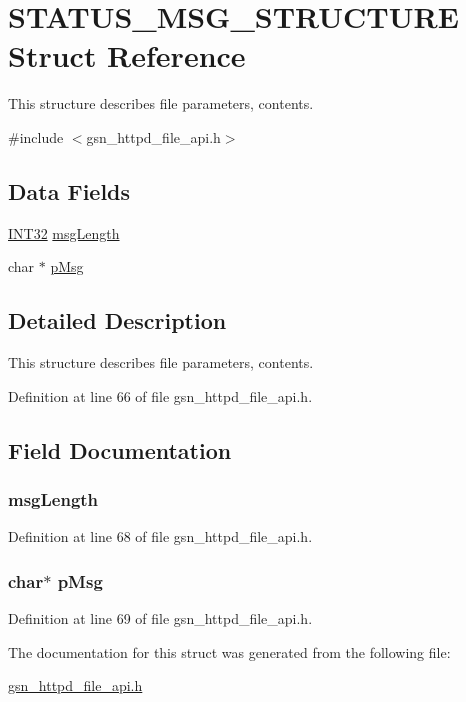 \hypertarget{a00461}{
\section{STATUS\_\-MSG\_\-STRUCTURE Struct Reference}
\label{a00461}
}


This structure describes file parameters, contents.  




{\ttfamily \#include $<$gsn\_\-httpd\_\-file\_\-api.h$>$}

\subsection*{Data Fields}
\begin{DoxyCompactItemize}
\item 
\hyperlink{a00660_ga63021d67d54286c2163bcdb43a6f2569}{INT32} \hyperlink{a00461_a3f0967ae6e83adfe4f7b64c137807c45}{msgLength}
\item 
char $\ast$ \hyperlink{a00461_a357ecb6bba9a491f210fe6eb23504495}{pMsg}
\end{DoxyCompactItemize}


\subsection{Detailed Description}
This structure describes file parameters, contents. 

Definition at line 66 of file gsn\_\-httpd\_\-file\_\-api.h.



\subsection{Field Documentation}
\hypertarget{a00461_a3f0967ae6e83adfe4f7b64c137807c45}{
\subsubsection[{msgLength}]{ {\bf msgLength}}}
\label{a00461_a3f0967ae6e83adfe4f7b64c137807c45}


Definition at line 68 of file gsn\_\-httpd\_\-file\_\-api.h.

\hypertarget{a00461_a357ecb6bba9a491f210fe6eb23504495}{
\subsubsection[{pMsg}]{\setlength{\rightskip}{0pt plus 5cm}char$\ast$ {\bf pMsg}}}
\label{a00461_a357ecb6bba9a491f210fe6eb23504495}


Definition at line 69 of file gsn\_\-httpd\_\-file\_\-api.h.



The documentation for this struct was generated from the following file:\begin{DoxyCompactItemize}
\item 
\hyperlink{a00511}{gsn\_\-httpd\_\-file\_\-api.h}\end{DoxyCompactItemize}
